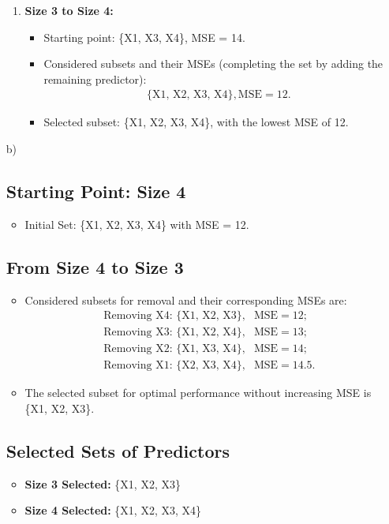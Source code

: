 \documentclass{article}
\begin{document}
\begin{itemize}
\begin{enumerate}
    \item \textbf{Size 3 to Size 4:}
    \begin{itemize}
        \item Starting point: \{X1, X3, X4\}, MSE = 14.
        \item Considered subsets and their MSEs (completing the set by adding the remaining predictor):
        \begin{align*}
            &\text{\{X1, X2, X3, X4\}}, \text{MSE} = 12.
        \end{align*}
        \item Selected subset: \{X1, X2, X3, X4\}, with the lowest MSE of 12.
    \end{itemize}
\end{enumerate}

    \item[b)]
        \subsection*{Starting Point: Size 4}
\begin{itemize}
    \item Initial Set: \{X1, X2, X3, X4\} with MSE = 12.
\end{itemize}

\subsection*{From Size 4 to Size 3}
\begin{itemize}
    \item Considered subsets for removal and their corresponding MSEs are:
    \begin{align*}
        &\text{Removing X4: \{X1, X2, X3\}}, &\text{MSE} = 12; \\
        &\text{Removing X3: \{X1, X2, X4\}}, &\text{MSE} = 13; \\
        &\text{Removing X2: \{X1, X3, X4\}}, &\text{MSE} = 14; \\
        &\text{Removing X1: \{X2, X3, X4\}}, &\text{MSE} = 14.5.
    \end{align*}
    \item The selected subset for optimal performance without increasing MSE is \{X1, X2, X3\}.
\end{itemize}
\subsection*{Selected Sets of Predictors}
\begin{itemize}
    \item \textbf{Size 3 Selected:} \{X1, X2, X3\}
    \item \textbf{Size 4 Selected:} \{X1, X2, X3, X4\}
\end{itemize}


\end{itemize}
\end{document}
